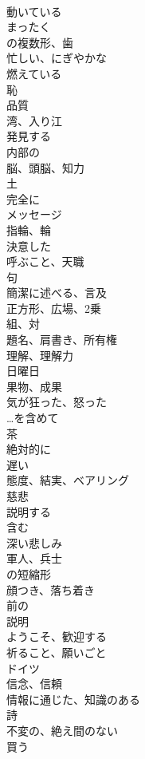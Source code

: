 \documentclass[8pt]{extreport}
\begin{document}
\begin{CJK}{UTF8}{min}
\\	動いている	
\\	まったく	
\\	の複数形、歯	
\\	忙しい、にぎやかな	
\\	燃えている	
\\	恥	
\\	品質	
\\	湾、入り江	
\\	発見する	
\\	内部の	
\\	脳、頭脳、知力	
\\	土	
\\	完全に	
\\	メッセージ	
\\	指輪、輪	
\\	決意した	
\\	呼ぶこと、天職	
\\	句	
\\	簡潔に述べる、言及	
\\	正方形、広場、2乗	
\\	組、対	
\\	題名、肩書き、所有権	
\\	理解、理解力	
\\	日曜日	
\\	果物、成果	
\\	気が狂った、怒った	
\\	…を含めて	
\\	茶	
\\	絶対的に	
\\	遅い	
\\	態度、結実、ベアリング	
\\	慈悲	
\\	説明する	
\\	含む	
\\	深い悲しみ	
\\	軍人、兵士	
\\	の短縮形	
\\	顔つき、落ち着き	
\\	前の	
\\	説明	
\\	ようこそ、歓迎する	
\\	祈ること、願いごと	
\\	ドイツ	
\\	信念、信頼	
\\	情報に通じた、知識のある	
\\	詩	
\\	不変の、絶え間のない	
\\	買う	

\end{CJK}
\end{document}

